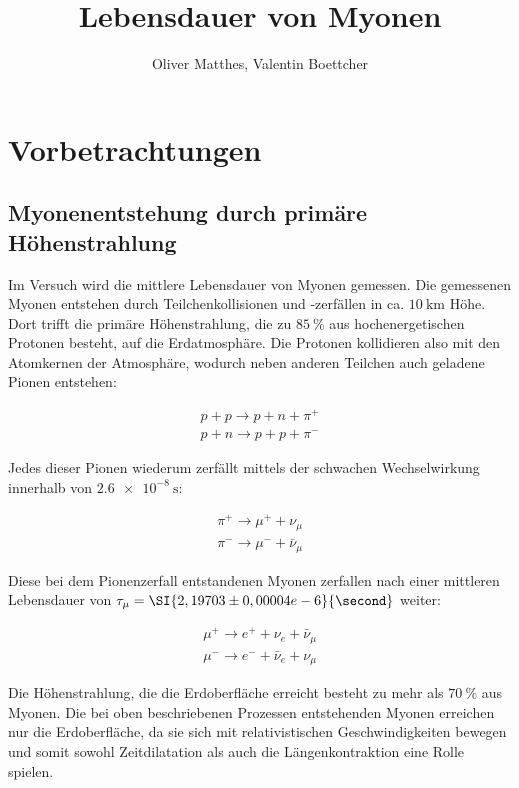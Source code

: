 \documentclass[slug=LM, room=Andreas-Schubert-Bau\,\ K\ 1A, supervisor=Anne-Sophie\ Berthold, coursedate=13.\ 12.\ 2019]{../../Lab_Report_LaTeX/lab_report}
\title{Lebensdauer von Myonen}
\author{Oliver Matthes, Valentin Boettcher}
\begin{document}
\maketitle

\section{Vorbetrachtungen}
\label{sec:einl}

\subsection{Myonenentstehung durch primäre Höhenstrahlung}
\label{sec:myonenenst}

Im Versuch wird die mittlere Lebensdauer von Myonen gemessen.
Die gemessenen Myonen entstehen durch Teilchenkollisionen und -zerfällen in ca.
\(\SI{10}{\kilo\metre}\) Höhe. Dort trifft die primäre Höhenstrahlung, die zu
\(\SI{85}{\percent}\) aus hochenergetischen Protonen besteht, auf die Erdatmosphäre.
Die Protonen kollidieren also mit den Atomkernen der Atmosphäre, wodurch neben anderen Teilchen
auch geladene Pionen entstehen:

\begin{align}\label{eq:pionen}
 p + p \rightarrow p + n + \pi^+ \\
 p + n \rightarrow p + p + \pi^-
\end{align}

Jedes dieser Pionen wiederum zerfällt mittels der schwachen Wechselwirkung innerhalb von
\(\SI{2,6e-8}{\second}\):

\begin{align}\label{eq:myonen}
\pi^+ \rightarrow \mu^+ + \nu_\mu \\
\pi^- \rightarrow \mu^- + \bar\nu_\mu
\end{align}

Diese bei dem Pionenzerfall entstandenen Myonen zerfallen nach einer mittleren Lebensdauer von
\(\tau_\mu = \SI{2,19703\pm0,00004e-6}{\second}\)\cite{pdg} weiter:

\begin{align}
        \mu^+ \rightarrow e^+ + \nu_e + \bar\nu_\mu \\
        \mu^- \rightarrow e^- + \bar\nu_e + \nu_\mu
\end{align}

Die Höhenstrahlung, die die Erdoberfläche erreicht besteht zu mehr als \(\SI{70}{\percent}\)
aus Myonen. Die bei oben beschriebenen Prozessen entstehenden Myonen erreichen nur die
Erdoberfläche, da sie sich mit relativistischen Geschwindigkeiten bewegen und somit sowohl
Zeitdilatation als auch die Längenkontraktion eine Rolle spielen.\\
\end{document}
